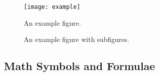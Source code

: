 \begin{figure}[ht]
    \centering
    \texttt{[image: example]}
    \caption{An example figure.}\label{fig:example}
\end{figure}
\begin{figure}[ht]
    \centering
    \hpad
    \caption{An example figure with subfigures.}\label{fig:subfigs}
\end{figure}


\subsection{Math Symbols and Formulae}\label{sub:method:mathematics}

